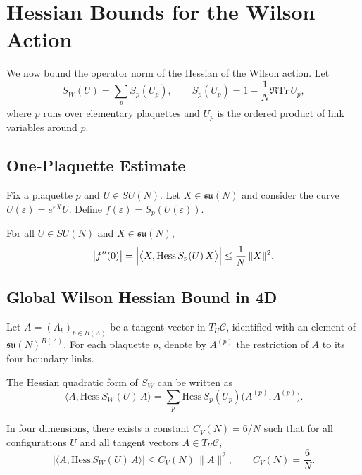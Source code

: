 
\section{Hessian Bounds for the Wilson Action}

We now bound the operator norm of the Hessian of the Wilson action.
Let
\[
  S_W(U) = \sum_{p} S_p(U_p),
  \qquad
  S_p(U_p) = 1 - \frac{1}{N}\Re\mathrm{Tr}\,U_p,
\]
where $p$ runs over elementary plaquettes and $U_p$ is the ordered
product of link variables around $p$.

\subsection{One-Plaquette Estimate}

Fix a plaquette $p$ and $U\in SU(N)$. Let $X\in\mathfrak{su}(N)$ and
consider the curve $U(\varepsilon) = e^{\varepsilon X} U$.
Define $f(\varepsilon) = S_p(U(\varepsilon))$.

\begin{lemma}
  For all $U\in SU(N)$ and $X\in\mathfrak{su}(N)$,
  \[
    \bigl|f''(0)\bigr|
    = \Bigl|
        \big\langle X, \mathrm{Hess}\,S_p(U)\,X\big\rangle
      \Bigr|
    \le \frac{1}{N}\,\|X\|^2.
  \]
\end{lemma}

\subsection{Global Wilson Hessian Bound in 4D}

Let $A = (A_b)_{b\in B(\Lambda)}$ be a tangent vector in
$T_U\mathcal{C}$, identified with an element of
$\mathfrak{su}(N)^{B(\Lambda)}$. For each plaquette $p$, denote by
$A^{(p)}$ the restriction of $A$ to its four boundary links.

The Hessian quadratic form of $S_W$ can be written as
\[
  \langle A, \mathrm{Hess}\,S_W(U)\,A\rangle
  = \sum_p \mathrm{Hess}\,S_p(U_p)\bigl(A^{(p)},A^{(p)}\bigr).
\]

\begin{theorem}[Wilson Hessian Bound in $d=4$]
  In four dimensions, there exists a constant $C_V(N) = 6/N$ such that
  for all configurations $U$ and all tangent vectors
  $A \in T_U\mathcal{C}$,
  \[
    \bigl|\langle A, \mathrm{Hess}\,S_W(U)\,A\rangle\bigr|
    \le C_V(N)\,\|A\|^2,
    \qquad C_V(N) = \frac{6}{N}.
  \]
\end{theorem}
